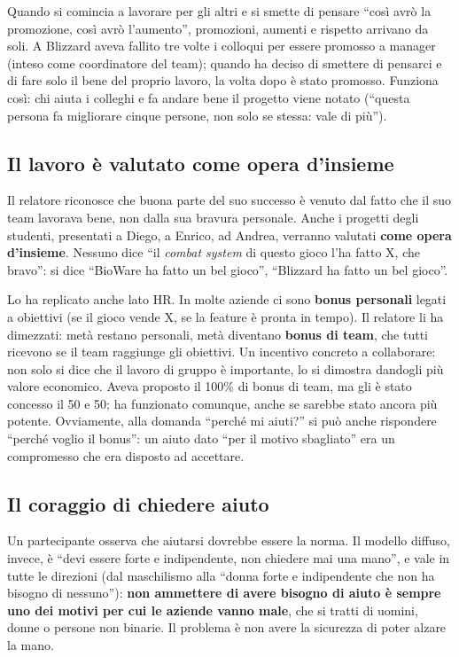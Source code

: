 Quando si comincia a lavorare per gli altri e si smette di pensare ``così avrò
la promozione, così avrò l'aumento'', promozioni, aumenti e rispetto arrivano
da soli. A Blizzard aveva fallito tre volte i colloqui per essere promosso a
manager (inteso come coordinatore del team); quando ha deciso di smettere di
pensarci e di fare solo il bene del proprio lavoro, la volta dopo è stato
promosso. Funziona così: chi aiuta i colleghi e fa andare bene il progetto
viene notato (``questa persona fa migliorare cinque persone, non solo se
stessa: vale di più'').

\subsection{Il lavoro è valutato come opera d'insieme}

Il relatore riconosce che buona parte del suo successo è venuto dal fatto che
il suo team lavorava bene, non dalla sua bravura personale. Anche i progetti
degli studenti, presentati a Diego, a Enrico, ad Andrea, verranno valutati
\textbf{come opera d'insieme}. Nessuno dice ``il \emph{combat system} di questo
gioco l'ha fatto X, che bravo'': si dice ``BioWare ha fatto un bel gioco'',
``Blizzard ha fatto un bel gioco''.

Lo ha replicato anche lato HR. In molte aziende ci sono \textbf{bonus
personali} legati a obiettivi (se il gioco vende X, se la feature è pronta in
tempo). Il relatore li ha dimezzati: metà restano personali, metà diventano
\textbf{bonus di team}, che tutti ricevono se il team raggiunge gli obiettivi.
Un incentivo concreto a collaborare: non solo si dice che il lavoro di gruppo è
importante, lo si dimostra dandogli più valore economico. Aveva proposto il
100\% di bonus di team, ma gli è stato concesso il 50 e 50; ha funzionato
comunque, anche se sarebbe stato ancora più potente. Ovviamente, alla
domanda ``perché mi aiuti?'' si può anche rispondere ``perché voglio il
bonus'': un aiuto dato ``per il motivo sbagliato'' era un compromesso che era
disposto ad accettare.

\subsection{Il coraggio di chiedere aiuto}

Un partecipante osserva che aiutarsi dovrebbe essere la norma. Il modello
diffuso, invece, è ``devi essere forte e indipendente, non chiedere mai una
mano'', e vale in tutte le direzioni (dal maschilismo alla ``donna forte e
indipendente che non ha bisogno di nessuno''): \textbf{non ammettere di avere
bisogno di aiuto è sempre uno dei motivi per cui le aziende vanno male}, che si
tratti di uomini, donne o persone non binarie. Il problema è non avere la
sicurezza di poter alzare la mano.

